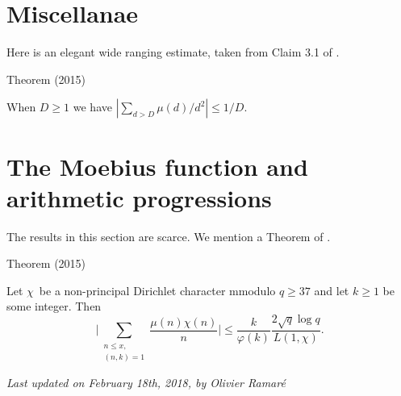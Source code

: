 \section{Miscellanae}


Here is an elegant wide ranging estimate, taken from Claim 3.1 of
\cite{Trevino*15}.

\begin{thm}{Theorem (2015)}

When $D\ge1$ we have $|\sum_{d>D}\mu(d)/d^2|\le 1/D$.
\end{thm}



\section{The Moebius function and arithmetic progressions}


The results in this section are scarce. We mention a Theorem of
\cite{Bordelles*15}.

\begin{thm}{Theorem (2015)}

  Let $\chi$\, be a non-principal Dirichlet character mmodulo
  $q\ge37$ and let $k\ge1$ be some integer. Then
  $$
  \biggl|\sum_{\substack{n\le x,\\ (n,k)=1}}\frac{\mu(n)\chi(n)}{n}\biggr|
  \le\frac{k}{\varphi(k)}\frac{2\sqrt{q}\log q}{L(1,\chi)}.
  $$
\end{thm}






  
\begin{flushright}\small\sl{}   Last updated on February 18th, 2018, by Olivier Ramar\'e
 \end{flushright}















